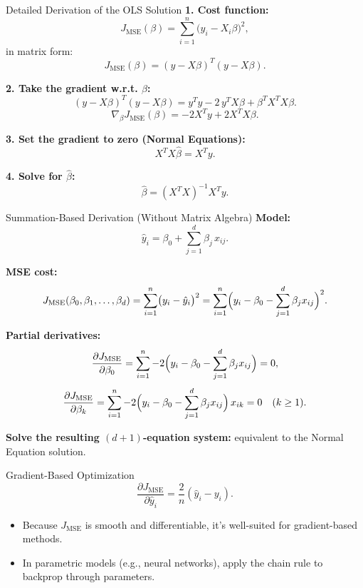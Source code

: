 \documentclass{beamer}
\begin{document}
\begin{frame}{Detailed Derivation of the OLS Solution}
\textbf{1. Cost function:}
\[
J_{\text{MSE}}(\beta) = \sum_{i=1}^n \bigl(y_i - X_i \beta\bigr)^2,
\]
in matrix form:
\[
J_{\text{MSE}}(\beta) = (y - X\beta)^T (y - X\beta).
\]

\textbf{2. Take the gradient w.r.t. \(\beta\):}
\[
(y - X\beta)^T (y - X\beta) 
= y^T y - 2\,y^T X\beta + \beta^T X^T X\beta.
\]
\[
\nabla_{\beta} J_{\text{MSE}}(\beta) 
= -2 X^T y + 2 X^T X\beta.
\]

\textbf{3. Set the gradient to zero (Normal Equations):}
\[
X^T X \hat{\beta} = X^T y.
\]

\textbf{4. Solve for \(\hat{\beta}\):}
\[
\hat{\beta} = (X^T X)^{-1} X^T y.
\]
\end{frame}

\begin{frame}{Summation-Based Derivation (Without Matrix Algebra)}
\textbf{Model:}
\[
\hat{y}_i = \beta_0 + \sum_{j=1}^d \beta_j \, x_{ij}.
\]

\textbf{MSE cost:}
\[
J_{\text{MSE}}(\beta_0, \beta_1, \dots, \beta_d) 
= \sum_{i=1}^n \bigl(y_i - \hat{y}_i\bigr)^2
= \sum_{i=1}^n 
\Bigl(y_i - \beta_0 - \sum_{j=1}^d \beta_j x_{ij}\Bigr)^2.
\]

\textbf{Partial derivatives:}
\[
\frac{\partial J_{\text{MSE}}}{\partial \beta_0} = 
\sum_{i=1}^n -2\Bigl(y_i - \beta_0 
- \sum_{j=1}^d \beta_j x_{ij}\Bigr) = 0,
\]
\[
\frac{\partial J_{\text{MSE}}}{\partial \beta_k} = 
\sum_{i=1}^n -2\Bigl(y_i - \beta_0 
- \sum_{j=1}^d \beta_j x_{ij}\Bigr)\, x_{ik} = 0\quad (k \ge 1).
\]

\textbf{Solve the resulting \((d+1)\)-equation system:} 
equivalent to the Normal Equation solution.
\end{frame}

\begin{frame}{Gradient-Based Optimization}
\[
\frac{\partial J_{\text{MSE}}}{\partial \hat{y}_i} 
= \frac{2}{n} (\hat{y}_i - y_i).
\]

\begin{itemize}
  \item Because \(J_{\text{MSE}}\) is smooth and differentiable, 
        it's well-suited for gradient-based methods.
  \item In parametric models (e.g., neural networks), 
        apply the chain rule to backprop through parameters.
\end{itemize}
\end{frame}
\end{document}
